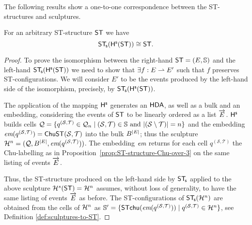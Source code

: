     The following results show a one-to-one correspondence between the ST-structures and sculptures.

    \begin{proposition}
        \label{prop:ST-to-Sculpture}
        For an arbitrary ST-structure $\mathsf{ST}$ we have
        \[
            \mathsf{ST}_{\!\mathsf{s}}(\mathsf{H}^{\mathsf{s}}(\mathsf{ST}))\cong \mathsf{ST}.
        \]
    \end{proposition}

    \begin{proof}
        To prove the isomorphism between the right-hand $\mathsf{ST}=(E,\mathbb{S})$ and the left-hand $\mathsf{ST}_{\!\mathsf{s}}(\mathsf{H}^{\mathsf{s}}(\mathsf{ST}))$ we need to show that $\exists f: E \rightharpoonup E'$ such that $f$ preserves ST-configurations.  
        We will consider $E'$ to be the events produced by the left-hand side of the isomorphism, precisely, by $\mathsf{ST}_{\!\mathsf{s}}(\mathsf{H}^{\mathsf{s}}(\mathsf{ST}))$.
    
        The application of the mapping $\mathsf{H}^{\mathsf{s}}$ 
        generates an $\text{\textup{\textsf{HDA}}}$, as well as a bulk and an embedding, considering the events of $\mathsf{ST}$ to be linearly ordered as a list $\overrightarrow{E}$. $\mathsf{H}^{\mathsf{s}}$ builds cells $\mathcal{Q}=\{q^{(\mathcal{S},\mathcal{T})}\in \mathcal{Q}_{n} \mid (\mathcal{S},\mathcal{T})\in\mathbb{S} \mbox{ and } | (\mathcal{S} \setminus \mathcal{T})|=n\}$ and the embedding $\textit{em}(q^{(\mathcal{S},\mathcal{T})})=\mathsf{ChuST}(\mathcal{S},\mathcal{T})$ into the bulk $B^{| E|}$; thus the sculpture $\mathcal{H}^{n}=(\mathcal{Q}, B^{| E|}, \textit{em}(q^{(\mathcal{S},\mathcal{T})}))$. The embedding $\textit{em}$ returns for each cell $q^{(\mathcal{S}, \mathcal{T})}$ the Chu-labelling as in Proposition~\ref{prop:ST-structure-Chu-over-3} on the same listing of events $\overrightarrow{E}$.
   
        Thus, the ST-structure produced on the left-hand side by $\mathsf{ST}_{\!\mathsf{s}}$ applied to the above sculpture $\mathcal{H}^{s}(\mathsf{ST})=\mathcal{H}^{n}$ assumes, without loss of generality, to have the same listing of events $\overrightarrow{E}$ as before.
        The ST-configurations of $\mathsf{ST}_{\!\mathsf{s}}(\mathcal{H}^{n})$ are obtained from the cells of $\mathcal{H}^{n}$ as $\mathbb{S}' = \{\mathsf{ST}\mathsf{chu}(\textit{em}(q^{(\mathcal{S},\mathcal{T})})) \mid q^{(\mathcal{S},\mathcal{T})} \in \mathcal{H}^{n}\}$, see Definition \ref{def:sculptures-to-ST}. 


\end{proof}
